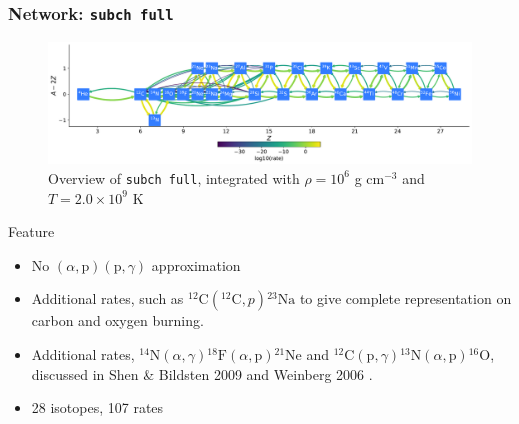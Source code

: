 \documentclass[
	11pt, %
]{beamer}
\begin{document}
\begin{frame}
\frametitle{Network: {\tt subch full}}
    \begin{figure}
        \centering
        \includegraphics[width=1\linewidth]{subch_full.pdf}
        \caption{\scriptsize Overview of {\tt subch full}, integrated with $\rho = 10^6$ g $\mathrm{cm}^{-3}$ and $T = 2.0 \times 10^9$ K}
    \end{figure}

    \begin{block}{Feature}
        \begin{itemize}
            \item \scriptsize No $(\alpha, \mbox{p})(\mbox{p}, \gamma)$ approximation
            \item \scriptsize Additional rates, such as ${}^{12}\mbox{C} ({}^{12}\mbox{C}, p){}^{23}\mbox{Na}$ to give complete representation on carbon and oxygen burning.
            \item \scriptsize Additional rates, ${}^{14}\mbox{N}(\alpha,\gamma){}^{18}\mbox{F}(\alpha, \mbox{p}){}^{21}\mbox{Ne}$ and ${}^{12}\mbox{C}(\mbox{p}, \gamma) {}^{13}\mbox{N}(\alpha, \mbox{p}){}^{16}\mbox{O}$, discussed in Shen \& Bildsten 2009 and Weinberg 2006 \cite{Shen_2009,Weinberg_2006}.
            \item 28 isotopes, 107 rates
        \end{itemize}
    \end{block}
\end{frame}
\end{document}
